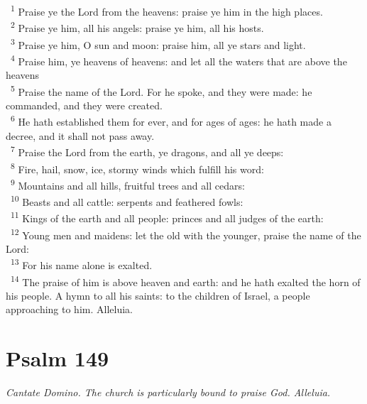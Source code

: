 \documentclass[a5paper,12pt]{article}
\begin{document}
\begin{multicols*}{2}
~\textsuperscript{1} Praise ye the Lord from the heavens: praise ye him in the high places.\\
~\textsuperscript{2} Praise ye him, all his angels: praise ye him, all his hosts.\\
~\textsuperscript{3} Praise ye him, O sun and moon: praise him, all ye stars and light.\\
~\textsuperscript{4} Praise him, ye heavens of heavens: and let all the waters that are above the heavens\\
~\textsuperscript{5} Praise the name of the Lord. For he spoke, and they were made: he commanded, and they were created.\\
~\textsuperscript{6} He hath established them for ever, and for ages of ages: he hath made a decree, and it shall not pass away.\\
~\textsuperscript{7} Praise the Lord from the earth, ye dragons, and all ye deeps:\\
~\textsuperscript{8} Fire, hail, snow, ice, stormy winds which fulfill his word:\\
~\textsuperscript{9} Mountains and all hills, fruitful trees and all cedars:\\
~\textsuperscript{10} Beasts and all cattle: serpents and feathered fowls:\\
~\textsuperscript{11} Kings of the earth and all people: princes and all judges of the earth:\\
~\textsuperscript{12} Young men and maidens: let the old with the younger, praise the name of the Lord:\\
~\textsuperscript{13} For his name alone is exalted.\\
~\textsuperscript{14} The praise of him is above heaven and earth: and he hath exalted the horn of his people. A hymn to all his saints: to the children of Israel, a people approaching to him. Alleluia.\\

\section{Psalm 149}
\label{sec:org064c417}
\emph{Cantate Domino. The church is particularly bound to praise God. Alleluia.}\\


\end{multicols*}
\end{document}
